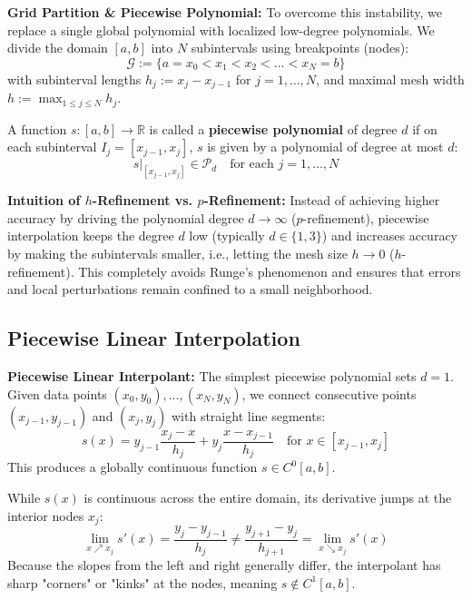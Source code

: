 \begin{definition}
    \textbf{Grid Partition \& Piecewise Polynomial:} To overcome this instability, we replace a single global polynomial with localized low-degree polynomials. We divide the domain $[a,b]$ into $N$ subintervals using breakpoints (nodes):
    $$\mathcal{G} := \{a = x_0 < x_1 < x_2 < \dots < x_N = b\}$$
    with subinterval lengths $h_j := x_j - x_{j-1}$ for $j = 1, \dots, N$, and maximal mesh width $h := \max_{1 \le j \le N} h_j$.

    A function $s: [a,b] \to \mathbb{R}$ is called a \textbf{piecewise polynomial} of degree $d$ if on each subinterval $I_j = [x_{j-1}, x_j]$, $s$ is given by a polynomial of degree at most $d$:
    $$s|_{[x_{j-1}, x_j]} \in \mathcal{P}_d \quad \text{for each } j = 1, \dots, N$$
\end{definition}

\begin{remark}
    \textbf{Intuition of $h$-Refinement vs. $p$-Refinement:} Instead of achieving higher accuracy by driving the polynomial degree $d \to \infty$ ($p$-refinement), piecewise interpolation keeps the degree $d$ low (typically $d \in \{1, 3\}$) and increases accuracy by making the subintervals smaller, i.e., letting the mesh size $h \to 0$ ($h$-refinement). This completely avoids Runge's phenomenon and ensures that errors and local perturbations remain confined to a small neighborhood.
\end{remark}

\subsection{Piecewise Linear Interpolation}

\begin{definition}
    \textbf{Piecewise Linear Interpolant:} The simplest piecewise polynomial sets $d=1$. Given data points $(x_0, y_0), \dots, (x_N, y_N)$, we connect consecutive points $(x_{j-1}, y_{j-1})$ and $(x_j, y_j)$ with straight line segments:
    $$s(x) = y_{j-1} \frac{x_j - x}{h_j} + y_j \frac{x - x_{j-1}}{h_j} \quad \text{for } x \in [x_{j-1}, x_j]$$
    This produces a globally continuous function $s \in C^0[a,b]$.
\end{definition}

\begin{remark}
    While $s(x)$ is continuous across the entire domain, its derivative jumps at the interior nodes $x_j$:
    $$\lim_{x \nearrow x_j} s'(x) = \frac{y_j - y_{j-1}}{h_j} \neq \frac{y_{j+1} - y_j}{h_{j+1}} = \lim_{x \searrow x_j} s'(x)$$
    Because the slopes from the left and right generally differ, the interpolant has sharp "corners" or "kinks" at the nodes, meaning $s \notin C^1[a,b]$.
\end{remark}

